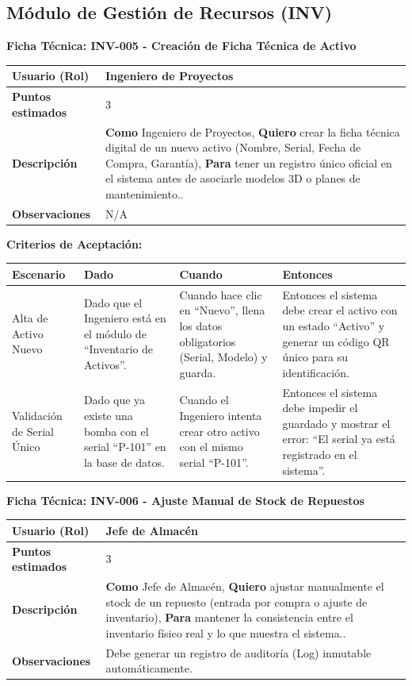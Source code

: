 \subsection{Módulo de Gestión de Recursos (INV)}

\noindent
\textbf{Ficha Técnica: INV-005 - Creación de Ficha Técnica de Activo}
\footnotesize
\begin{longtable}{|p{}|p{}|}
\hline
\textbf{Usuario (Rol)} & Ingeniero de Proyectos \\ \hline
\textbf{Puntos estimados} & 3 \\ \hline
\textbf{Descripción} & \textbf{Como} Ingeniero de Proyectos, \textbf{Quiero} crear la ficha técnica digital de un nuevo activo (Nombre, Serial, Fecha de Compra, Garantía), \textbf{Para} tener un registro único oficial en el sistema antes de asociarle modelos 3D o planes de mantenimiento.. \\ \hline
\textbf{Observaciones} & N/A \\ \hline
\end{longtable}
\normalsize

\noindent
\textbf{Criterios de Aceptación:}
\footnotesize
\begin{longtable}{|p{}|p{}|p{}|p{}|}
\hline
\textbf{Escenario} & \textbf{Dado} & \textbf{Cuando} & \textbf{Entonces} \\ \hline
\endhead
Alta de Activo Nuevo & Dado que el Ingeniero está en el módulo de ``Inventario de Activos''. & Cuando hace clic en ``Nuevo'', llena los datos obligatorios (Serial, Modelo) y guarda. & Entonces el sistema debe crear el activo con un estado ``Activo'' y generar un código QR único para su identificación. \\ \hline
Validación de Serial Único & Dado que ya existe una bomba con el serial ``P-101'' en la base de datos. & Cuando el Ingeniero intenta crear otro activo con el mismo serial ``P-101''. & Entonces el sistema debe impedir el guardado y mostrar el error: ``El serial ya está registrado en el sistema''. \\ \hline
\end{longtable}
\normalsize

\noindent
\textbf{Ficha Técnica: INV-006 - Ajuste Manual de Stock de Repuestos}
\footnotesize
\begin{longtable}{|p{}|p{}|}
\hline
\textbf{Usuario (Rol)} & Jefe de Almacén \\ \hline
\textbf{Puntos estimados} & 3 \\ \hline
\textbf{Descripción} & \textbf{Como} Jefe de Almacén, \textbf{Quiero} ajustar manualmente el stock de un repuesto (entrada por compra o ajuste de inventario), \textbf{Para} mantener la consistencia entre el inventario físico real y lo que muestra el sistema.. \\ \hline
\textbf{Observaciones} & Debe generar un registro de auditoría (Log) inmutable automáticamente. \\ \hline
\end{longtable}
\normalsize


